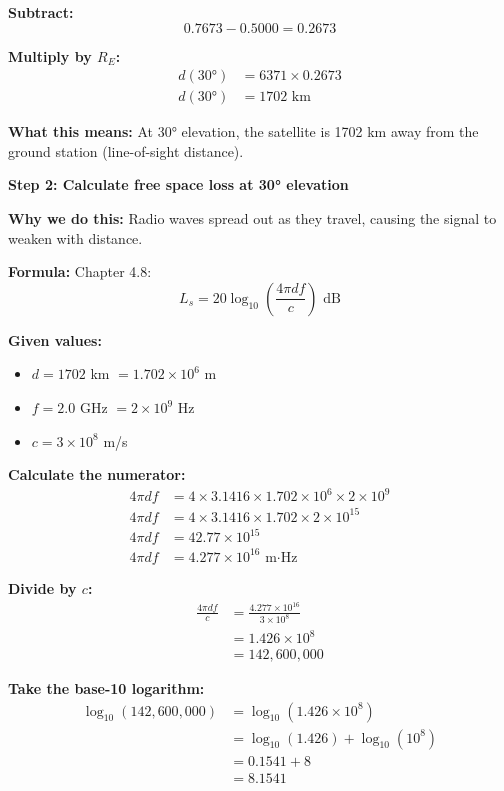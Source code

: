 \documentclass[11pt,letterpaper]{article}
\begin{document}
\textbf{Subtract:}
\begin{equation}
0.7673 - 0.5000 = 0.2673
\end{equation}

\textbf{Multiply by $R_E$:}
\begin{align}
d(30°) &= 6371 \times 0.2673 \\
d(30°) &= 1702 \text{ km}
\end{align}

\textbf{What this means:} At 30° elevation, the satellite is 1702 km away from the ground station (line-of-sight distance).

\vspace{0.3cm}

\textbf{Step 2: Calculate free space loss at 30° elevation}

\textbf{Why we do this:} Radio waves spread out as they travel, causing the signal to weaken with distance.

\textbf{Formula:} Chapter 4.8:
\begin{equation}
L_s = 20 \log_{10}\left(\frac{4\pi d f}{c}\right) \text{ dB}
\end{equation}

\textbf{Given values:}
\begin{itemize}
    \item $d = 1702$ km $= 1.702 \times 10^6$ m
    \item $f = 2.0$ GHz $= 2 \times 10^9$ Hz
    \item $c = 3 \times 10^8$ m/s
\end{itemize}

\textbf{Calculate the numerator:}
\begin{align}
4\pi d f &= 4 \times 3.1416 \times 1.702 \times 10^6 \times 2 \times 10^9 \\
4\pi d f &= 4 \times 3.1416 \times 1.702 \times 2 \times 10^{15} \\
4\pi d f &= 42.77 \times 10^{15} \\
4\pi d f &= 4.277 \times 10^{16} \text{ m·Hz}
\end{align}

\textbf{Divide by $c$:}
\begin{align}
\frac{4\pi d f}{c} &= \frac{4.277 \times 10^{16}}{3 \times 10^8} \\
&= 1.426 \times 10^{8} \\
&= 142,600,000
\end{align}

\textbf{Take the base-10 logarithm:}
\begin{align}
\log_{10}(142,600,000) &= \log_{10}(1.426 \times 10^{8}) \\
&= \log_{10}(1.426) + \log_{10}(10^{8}) \\
&= 0.1541 + 8 \\
&= 8.1541
\end{align}
\end{document}
